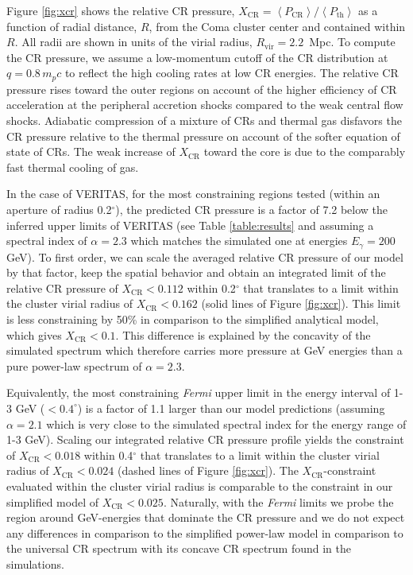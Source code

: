 \documentclass[12pt,manuscript]{aastex}
\def\Fermi{{\em Fermi}\xspace}
\newcommand{\expval}[1]{\left\langle #1 \right\rangle}
\newcommand{\rmn}{\mathrm}
\newcommand{\CR}{\mathrm{CR}}
\begin{document}
Figure \ref{fig:xcr} shows the relative CR pressure, $X_{\CR} =
\expval{P_{\CR}}/\expval{P_\rmn{th}}$ as a function of radial distance, $R$, from the Coma cluster
center and contained within $R$. All radii are shown in units of the virial radius,
$R_\rmn{vir}=2.2$~Mpc. To compute the CR pressure, we assume a low-momentum cutoff of the CR
distribution at $q = 0.8\,m_p c$ to reflect the high cooling rates at low CR energies. The relative
CR pressure rises toward the outer regions on account of the higher efficiency of CR acceleration at
the peripheral accretion shocks compared to the weak central flow shocks. Adiabatic compression of a
mixture of CRs and thermal gas disfavors the CR pressure relative to the thermal pressure on
account of the softer equation of state of CRs. The weak increase of $X_{\CR}$ toward the core is
due to the comparably fast thermal cooling of gas.

In the case of VERITAS, for the most constraining regions tested (within an aperture of radius
0.2$^{\circ}$), the predicted CR pressure is a factor of 7.2 below the inferred upper limits of
VERITAS (see Table \ref{table:results} and assuming a spectral index of $\alpha=2.3$ which matches
the simulated one at energies $E_\gamma=200$ GeV). To first order, we can scale the averaged
relative CR pressure of our model by that factor, keep the spatial behavior and obtain an integrated
limit of the relative CR pressure of $X_{\CR}<0.112$ within 0.2$^{\circ}$ that translates to a limit
within the cluster virial radius of $X_\CR<0.162$ (solid lines of Figure \ref{fig:xcr}). This limit
is less constraining by 50\% in comparison to the simplified analytical model, which gives
$X_\CR<0.1$. This difference is explained by the concavity of the simulated spectrum which therefore
carries more pressure at GeV energies than a pure power-law spectrum of $\alpha=2.3$.

Equivalently, the most constraining \Fermi upper limit in the energy interval of 1-3 GeV
($<0.4^\circ$) is a factor of 1.1 larger than our model predictions (assuming $\alpha=2.1$ which is
very close to the simulated spectral index for the energy range of 1-3 GeV). Scaling our integrated
relative CR pressure profile yields the constraint of $X_{\CR}<0.018$ within 0.4$^{\circ}$ that
translates to a limit within the cluster virial radius of $X_\CR<0.024$ (dashed lines of Figure
\ref{fig:xcr}). The $X_\CR$-constraint evaluated within the cluster virial radius is comparable to
the constraint in our simplified model of $X_\CR<0.025$. Naturally, with the \Fermi limits we probe
the region around GeV-energies that dominate the CR pressure and we do not expect any differences in
comparison to the simplified power-law model in comparison to the universal CR spectrum with its
concave CR spectrum found in the simulations.
\end{document}
